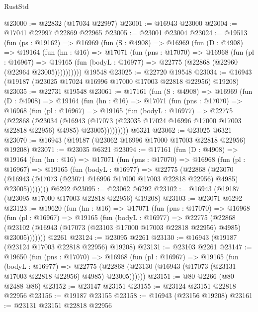 \begin{lexlean}{RustStd}
\begin{coremodule}
@23000 := @22832 (@17034 @22997)
@23001 := @16943 @23000
@23004 := @17041 @22997 @22869 @22965
@23005 := @23001 @23004
@23024 := @19513
    (fun (ps : @19162) =>
    @16969
      (fun (S : @4908) =>
      @16969
        (fun (D : @4908) =>
        @19164
          (fun (hn : @16) =>
          @17071
            (fun (pns : @17070) =>
            @16968
              (fun (pl : @16967) =>
              @19165 (fun (bodyL : @16977) => @22775 (@22868 (@22960 (@22964 @23005))))))))))
    @19548
@23025 := @22720 @19548
@23034 := @16943 (@19187 (@23025 @17024 @16996 @17000 @17003 @22818 @22956) @19208)
@23035 := @22731 @19548
@23061 := @17161
    (fun (S : @4908) =>
    @16969
      (fun (D : @4908) =>
      @19164
        (fun (hn : @16) =>
        @17071
          (fun (pns : @17070) =>
          @16968
            (fun (pl : @16967) =>
            @19165
              (fun (bodyL : @16977) =>
              @22775
                (@22868
                  (@23034
                    (@16943
                      (@17073 (@23035 @17024 @16996 @17000 @17003 @22818 @22956) @4985)
                      @23005)))))))))
    @6321
@23062 := @23025 @6321
@23070 := @16943 (@19187 (@23062 @16996 @17000 @17003 @22818 @22956) @19208)
@23071 := @23035 @6321
@23094 := @17161
    (fun (D : @4908) =>
    @19164
      (fun (hn : @16) =>
      @17071
        (fun (pns : @17070) =>
        @16968
          (fun (pl : @16967) =>
          @19165
            (fun (bodyL : @16977) =>
            @22775
              (@22868
                (@23070
                  (@16943 (@17073 (@23071 @16996 @17000 @17003 @22818 @22956) @4985) @23005))))))))
    @6292
@23095 := @23062 @6292
@23102 := @16943 (@19187 (@23095 @17000 @17003 @22818 @22956) @19208)
@23103 := @23071 @6292
@23123 := @19620
    (fun (hn : @16) =>
    @17071
      (fun (pns : @17070) =>
      @16968
        (fun (pl : @16967) =>
        @19165
          (fun (bodyL : @16977) =>
          @22775
            (@22868
              (@23102 (@16943 (@17073 (@23103 @17000 @17003 @22818 @22956) @4985) @23005)))))))
    @2261
@23124 := @23095 @2261
@23130 := @16943 (@19187 (@23124 @17003 @22818 @22956) @19208)
@23131 := @23103 @2261
@23147 := @19650
    (fun (pns : @17070) =>
    @16968
      (fun (pl : @16967) =>
      @19165
        (fun (bodyL : @16977) =>
        @22775 (@22868 (@23130 (@16943 (@17073 (@23131 @17003 @22818 @22956) @4985) @23005))))))
@23151 := @80 @2266 (@80 @2488 @86)
@23152 := @23147 @23151
@23155 := @23124 @23151 @22818 @22956
@23156 := @19187 @23155
@23158 := @16943 (@23156 @19208)
@23161 := @23131 @23151 @22818 @22956

\end{coremodule}
\end{lexlean}
